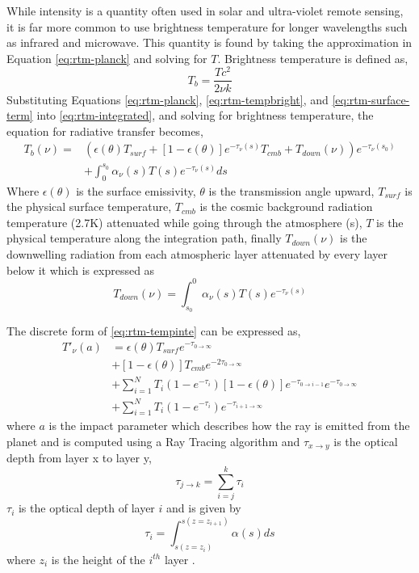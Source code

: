 While intensity is a quantity often used in solar and ultra-violet remote sensing, it is far more common to use brightness temperature for longer wavelengths such as infrared and microwave. This quantity is found by taking the approximation in Equation \ref{eq:rtm-planck} and solving for $T$. Brightness temperature is defined as,
\begin{equation}\label{eq:rtm-tempbright}
T_b = \frac{Tc^2}{2\nu k}
\end{equation}
Substituting Equations \ref{eq:rtm-planck}, \ref{eq:rtm-tempbright}, and \ref{eq:rtm-surface-term} into \ref{eq:rtm-integrated}, and solving for brightness temperature, the equation for radiative transfer becomes, 
\begin{equation}\label{eq:rtm-tempinte}
\begin{split}
T_b(\nu) = &\left(\epsilon(\theta)T_{surf} + [1-\epsilon(\theta)]e^{-\tau_\nu(s)}T_{cmb}+ T_{down}(\nu)\right)e^{-\tau_\nu(s_0)}\\
&+\int_0^{s_0} \alpha_\nu(s)T(s) e^{-\tau_\nu(s)}ds
\end{split}
\end{equation}
Where $\epsilon(\theta)$ is the surface emissivity, $\theta$ is the transmission angle upward, $T_{surf}$ is the physical surface temperature, $T_{cmb}$ is the cosmic background radiation temperature (2.7K) attenuated while going through the atmosphere (s), $T$ is the physical temperature along the integration path, finally $T_{down}(\nu)$ is the downwelling radiation from each atmospheric layer attenuated by every layer below it which is expressed as
\begin{equation}
T_{down}(\nu) = \int_{s_0}^{0} \alpha_\nu(s)T(s) e^{-\tau_\nu(s)}
\end{equation}  

The discrete form of \ref{eq:rtm-tempinte} can be expressed as,
\begin{equation}\label{eq:rtm-layers}
\begin{split}
T'_\nu(a) &= \epsilon(\theta)T_{surf} e^{-\tau_{0\rightarrow \infty}} \\
&+ [1-\epsilon(\theta)]T_{cmb}e^{-2\tau_{0\rightarrow\infty}}\\
&+ \sum_{i=1}^N T_i(1-e^{-\tau_i})[1-\epsilon(\theta)] e^{-\tau_{0\rightarrow i-1}} e^{-\tau_{0\rightarrow \infty}}\\
&+ \sum_{i=1}^N T_i(1-e^{-\tau_i}) e^{-\tau_{i+1\rightarrow \infty}} 
\end{split}
\end{equation}
where $a$ is the impact parameter which describes how the ray is emitted from the planet and is computed using a Ray Tracing algorithm and $\tau_{x\rightarrow y}$ is the optical depth from layer x to layer y, 
\begin{equation}\label{eq:rtm-layersum}
\tau_{j\rightarrow k} = \sum_{i=j}^k \tau_i
\end{equation}
$\tau_i$ is the optical depth of layer $i$ and is given by
\begin{equation}\label{eq:rtm-layerdepth}
\tau_i = \int_{s(z=z_i)}^{s(z=z_{i+1})} \alpha(s) ds
\end{equation}
where $z_i$ is the height of the $i^{th}$ layer \cite{Jenkins-2002}. 


